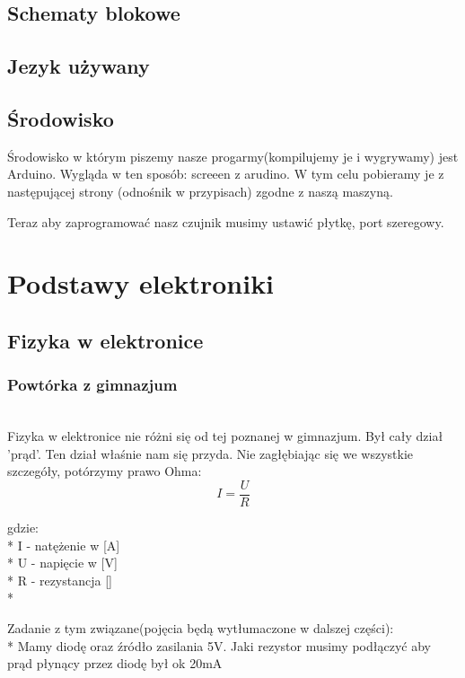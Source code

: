 
	\subsection {Schematy blokowe}
	\subsection{Jezyk używany}
	\subsection{Środowisko}
		Środowisko w którym piszemy nasze progarmy(kompilujemy je i wygrywamy) jest Arduino. Wygląda w ten sposób: screeen z arudino. 
W tym celu pobieramy je z następującej strony (odnośnik w przypisach) zgodne z naszą maszyną.

Teraz aby zaprogramować nasz czujnik musimy ustawić płytkę, port szeregowy.%
\newpage
\section{Podstawy elektroniki}
 \subsection{Fizyka w elektronice}
	\subsubsection{Powtórka z gimnazjum}
	\\Fizyka w elektronice nie różni się od tej poznanej w gimnazjum. Był cały dział 'prąd'. Ten dział właśnie nam się przyda. Nie zagłębiając się we wszystkie szczegóły, potórzymy prawo Ohma:
	\[I=\frac{U}{R}\]

	gdzie:\\*
	I - natężenie w [A] \\*
	U - napięcie w [V] \\*
	R - rezystancja [\Omega] \\*			

Zadanie z tym związane(pojęcia będą wytłumaczone w dalszej części): \\* Mamy diodę oraz źródło zasilania 5V. Jaki rezystor musimy podłączyć aby prąd płynący przez diodę był ok 20mA %
